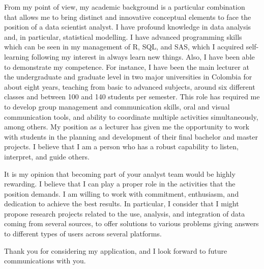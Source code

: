 \documentclass[11pt, a4paper]{awesome-cv}
\begin{document}
\begin{cvletter}
From my point of view, my academic background is a particular combination that allows me to bring distinct and innovative conceptual elements to face the position of a data scientist analyst. I have profound knowledge in data analysis and, in particular, statistical modelling. I have advanced programming skills which can be seen in my management of R, SQL, and SAS, which I acquired self-learning following my interest in always learn new things. Also, I have been able to demonstrate my competence. For instance, I have been the main lecturer at the undergraduate and graduate level in two major universities in Colombia for about eight years, teaching from basic to advanced subjects, around six different classes and between 100 and 140 students per semester. This role has required me to develop group management and communication skills, oral and visual communication tools, and ability to coordinate multiple activities simultaneously, among others. My position as a lecturer has given me the opportunity to work with students in the planning and development of their final bachelor and master projects. I believe that I am a person who has a robust capability to listen, interpret, and guide others. \par
It is my opinion that becoming part of your analyst team would be highly rewarding. I believe that I can play a proper role in the activities that the position demands. I am willing to work with commitment, enthusiasm, and dedication to achieve the best results. In particular, I consider that I might propose research projects related to the use, analysis, and integration of data coming from several sources, to offer solutions to various problems giving answers to different types of users across several platforms.\par\bigskip

Thank you for considering my application, and I look forward to future communications with you.
\end{cvletter}


\makeletterclosing
\end{document}

